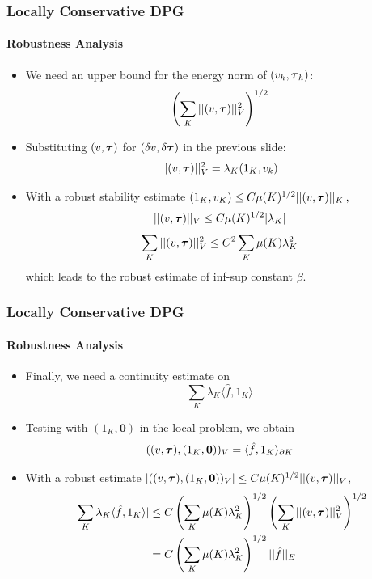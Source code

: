\documentclass[18pt,xcolor=table]{beamer}
\begin{document}
\begin{frame}
\frametitle{Locally Conservative DPG}
\framesubtitle{Robustness Analysis}
\begin{itemize}
    \item We need an upper bound for the energy norm of $(v_h,\boldsymbol\tau_h)$:
      \[
      \left( \sum_K||(v,\boldsymbol\tau)||^2_V \right)^{1/2}
      \]
    \item Substituting $(v,\boldsymbol\tau)$ for $(\delta v,\delta\boldsymbol\tau)$ in the
      previous slide:
      \[
      ||(v,\boldsymbol\tau)||^2_V=\lambda_K(1_K,v_k)
      \]
    \item With a robust stability estimate
      $
      (1_K,v_K)\leq C\mu(K)^{1/2}||(v,\boldsymbol\tau)||_K\,,
      $
      \[
      ||(v,\boldsymbol\tau)||_V\leq C\mu(K)^{1/2}|\lambda_K|
      \]
      \[
      \sum_K||(v,\boldsymbol\tau)||_V^2\leq C^2\sum_K\mu(K)\lambda_K^2
      \]
      which leads to the robust estimate of inf-sup constant $\beta$.
\end{itemize}
\end{frame}

\begin{frame}
\frametitle{Locally Conservative DPG}
\framesubtitle{Robustness Analysis}
\begin{itemize}
    \item Finally, we need a continuity estimate on
      \[
      \sum_K\lambda_K\langle\hat f,1_K\rangle
      \]
    \item Testing with $(1_K,\boldsymbol0)$ in the local problem, we obtain
      \[
      ( (v,\boldsymbol\tau),(1_K,\boldsymbol0) )_V=\langle\hat f,1_K\rangle_{\partial K}
      \]
    \item With a robust estimate $|( (v,\boldsymbol\tau),(1_K,\boldsymbol0) )_V|\leq
      C\mu(K)^{1/2}||(v,\boldsymbol\tau)||_V$,
      \begin{align*}
        |\sum_K\lambda_K\langle\hat f,1_K\rangle|
        &\leq C\left( \sum_K\mu(K)\lambda_K^2 \right)^{1/2}\left( \sum_K||(v,\boldsymbol\tau)||_V^2 \right)^{1/2}\\
        &=C\left( \sum_K\mu(K)\lambda_K^2 \right)^{1/2}||\hat f||_E
      \end{align*}
\end{itemize}
\end{frame}

\end{document}
